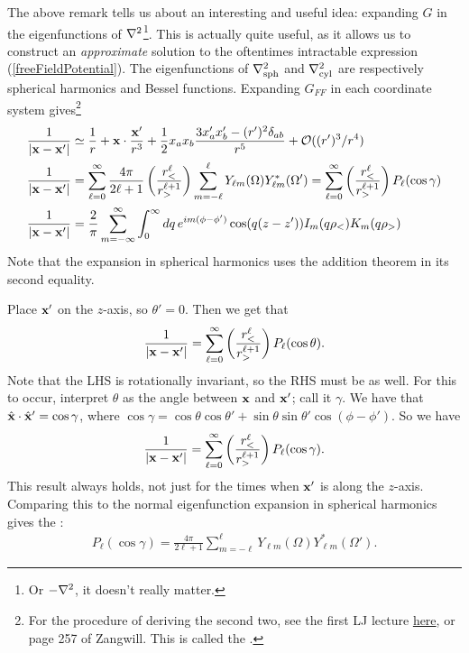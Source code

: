 \documentclass[11pt]{article}
\begin{document}
The above remark tells us about an interesting and useful idea:
expanding $G$ in the eigenfunctions of $\nabla^2$\footnote{Or
$- \nabla^2$, it doesn't really matter.}. This is
actually quite useful, as it allows us to construct an \emph{approximate} solution
to the oftentimes intractable expression (\ref{freeFieldPotential}).
The eigenfunctions of $\nabla_{\rm sph}^2$ and $\nabla_{\rm cyl}^2$
are respectively spherical harmonics and Bessel functions.
Expanding $G_{FF}$ in each coordinate system gives\footnote{For
the procedure of deriving the second two, see the first LJ lecture
\href{https://bohr.physics.berkeley.edu/classes/209/f02/lectures/Lecture.9.04.02.pdf}{here}, or page 257 of Zangwill.
This is called the .}
\begin{align*}
    \frac{1}{|\mathbf{x} - \mathbf{x}'|} & \simeq \frac{1}{r} + \mathbf{x} \cdot \frac{\mathbf{x}'}{r^3} + \frac{1}{2} x_a x_b \frac{3 x_a' x_b' - (r')^2 \delta_{ab}}{r^5} + \mathcal{O}((r')^3/r^4)\\
    \frac{1}{|\mathbf{x} - \mathbf{x}'|} & = \sum_{\ell = 0}^\infty \frac{4\pi}{2\ell + 1} \left( \frac{r_<^\ell}{r_>^{\ell + 1}} \right) \sum_{m = -\ell}^\ell Y_{\ell m}(\Omega) Y_{\ell m}^*(\Omega')
    = \sum_{\ell = 0}^\infty \left(  \frac{r_<^\ell}{r_>^{\ell + 1}} \right) P_\ell(\cos{\gamma})\\
    \frac{1}{|\mathbf{x} - \mathbf{x}'|} & = \frac{2}{\pi} \sum_{m = - \infty}^\infty
    \int_0^\infty dq \, e^{im(\phi - \phi')} \cos(q(z - z')) I_m(q\rho_<) K_m(q\rho_>)
\end{align*}
Note that the expansion in spherical harmonics uses the
addition theorem in its second equality.

\begin{iidea}
    Place $\mathbf{x}'$ on the $z$-axis, so $\theta' = 0$. Then
    we get that
    \begin{align*}
        \frac{1}{|\mathbf{x} - \mathbf{x}'|} = \sum_{\ell = 0}^\infty \left( \frac{r_<^\ell}{r_>^{\ell + 1}} \right) P_\ell(\cos{\theta}).
    \end{align*}
    Note that the LHS is rotationally invariant, so the RHS must be as well.
    For this to occur, interpret $\theta$ as the angle between $\mathbf{x}$ and $\mathbf{x}'$;
    call it $\gamma$. We have that $\hat{\mathbf{x}} \cdot \hat{\mathbf{x}}' = \cos{\gamma}$,
    where $\cos{\gamma} = \cos{\theta} \cos{\theta'} + \sin{\theta} \sin{\theta'} \cos(\phi - \phi')$.
    So we have
    \begin{align*}
        \frac{1}{|\mathbf{x} - \mathbf{x}'|} = \sum_{\ell = 0}^\infty \left( \frac{r_<^\ell}{r_>^{\ell + 1}} \right) P_\ell(\cos{\gamma}).
    \end{align*}
    This result always holds, not just for the times when $\mathbf{x}'$ is along the
    $z$-axis. Comparing this to the normal eigenfunction expansion in spherical
    harmonics gives the :
    \begin{align*}
        \boxed{P_\ell(\cos{\gamma}) = \frac{4\pi}{2\ell + 1} \sum_{m = - \ell}^\ell Y_{\ell m}(\Omega) Y_{\ell m}^*(\Omega').}
    \end{align*}
\end{iidea}
\end{document}
